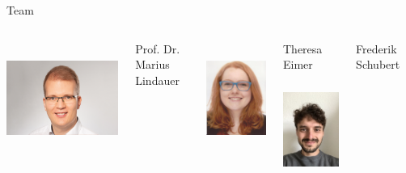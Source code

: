\begin{frame}[c]{Team}
	
	\begin{columns}[T]
		
		\centering
		\includegraphics[height=10em]{images/marius}
		
		Prof. Dr.\\ Marius Lindauer
		
		\centering
		\includegraphics[height=10em]{images/theresa.png}
		
		Theresa Eimer\\
		
		\centering
		\includegraphics[height=10em]{images/frederik.jpg}
		
		Frederik Schubert \\
		
		
	\end{columns}
	
	
\end{frame}
